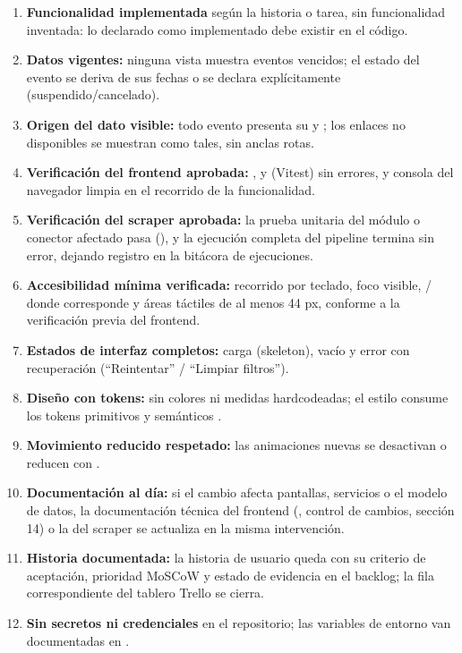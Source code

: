 \documentclass[11pt,a4paper]{article}
\begin{document}
\begin{enumerate}
  \item \textbf{Funcionalidad implementada} según la historia o tarea, sin
        funcionalidad inventada: lo declarado como implementado debe existir en
        el código.
  \item \textbf{Datos vigentes:} ninguna vista muestra eventos vencidos; el
        estado del evento se deriva de sus fechas o se declara explícitamente
        (suspendido/cancelado).
  \item \textbf{Origen del dato visible:} todo evento presenta su
         y ; los enlaces no disponibles
        se muestran como tales, sin anclas rotas.
  \item \textbf{Verificación del frontend aprobada:} ,  y 
        (Vitest) sin errores, y consola del navegador limpia en el recorrido de
        la funcionalidad.
  \item \textbf{Verificación del scraper aprobada:} la prueba unitaria del
        módulo o conector afectado pasa (), y la ejecución completa del pipeline termina sin error,
        dejando registro en la bitácora de ejecuciones.
  \item \textbf{Accesibilidad mínima verificada:} recorrido por teclado,
        foco visible, / donde corresponde y
        áreas táctiles de al menos 44 px, conforme a la verificación previa del
        frontend.
  \item \textbf{Estados de interfaz completos:} carga (skeleton), vacío y
        error con recuperación (``Reintentar'' / ``Limpiar filtros'').
  \item \textbf{Diseño con tokens:} sin colores ni medidas hardcodeadas; el
        estilo consume los tokens primitivos  y semánticos
        .
  \item \textbf{Movimiento reducido respetado:} las animaciones nuevas se
        desactivan o reducen con .
  \item \textbf{Documentación al día:} si el cambio afecta pantallas,
        servicios o el modelo de datos, la documentación técnica del frontend
        (, control de cambios, sección 14) o la del
        scraper se actualiza en la misma intervención.
  \item \textbf{Historia documentada:} la historia de usuario queda con su
        criterio de aceptación, prioridad MoSCoW y estado de evidencia en el
        backlog; la fila correspondiente del tablero Trello se cierra.
  \item \textbf{Sin secretos ni credenciales} en el repositorio; las
        variables de entorno van documentadas en .
\end{enumerate}
\end{document}
